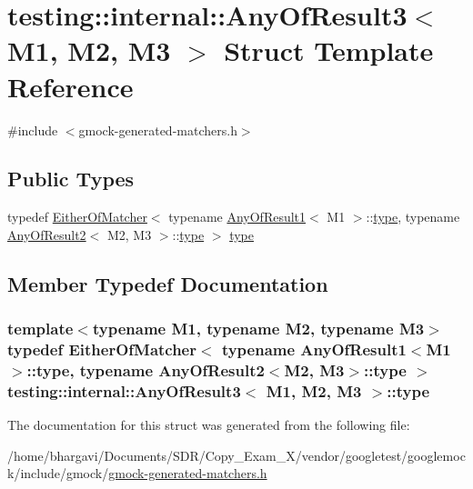 \hypertarget{structtesting_1_1internal_1_1_any_of_result3}{}\section{testing\+:\+:internal\+:\+:Any\+Of\+Result3$<$ M1, M2, M3 $>$ Struct Template Reference}
\label{structtesting_1_1internal_1_1_any_of_result3}


{\ttfamily \#include $<$gmock-\/generated-\/matchers.\+h$>$}

\subsection*{Public Types}
\begin{DoxyCompactItemize}
\item 
typedef \hyperlink{classtesting_1_1internal_1_1_either_of_matcher}{Either\+Of\+Matcher}$<$ typename \hyperlink{structtesting_1_1internal_1_1_any_of_result1}{Any\+Of\+Result1}$<$ M1 $>$\+::\hyperlink{structtesting_1_1internal_1_1_any_of_result3_a232b20553cc0a33a6741e85e19ef4b0c}{type}, typename \hyperlink{structtesting_1_1internal_1_1_any_of_result2}{Any\+Of\+Result2}$<$ M2, M3 $>$\+::\hyperlink{structtesting_1_1internal_1_1_any_of_result3_a232b20553cc0a33a6741e85e19ef4b0c}{type} $>$ \hyperlink{structtesting_1_1internal_1_1_any_of_result3_a232b20553cc0a33a6741e85e19ef4b0c}{type}
\end{DoxyCompactItemize}


\subsection{Member Typedef Documentation}
\subsubsection[{\texorpdfstring{type}{type}}]{\setlength{\rightskip}{0pt plus 5cm}template$<$typename M1, typename M2, typename M3$>$ typedef {\bf Either\+Of\+Matcher}$<$ typename {\bf Any\+Of\+Result1}$<$M1$>$\+::{\bf type}, typename {\bf Any\+Of\+Result2}$<$M2, M3$>$\+::{\bf type} $>$ {\bf testing\+::internal\+::\+Any\+Of\+Result3}$<$ M1, M2, M3 $>$\+::{\bf type}}\hypertarget{structtesting_1_1internal_1_1_any_of_result3_a232b20553cc0a33a6741e85e19ef4b0c}{}\label{structtesting_1_1internal_1_1_any_of_result3_a232b20553cc0a33a6741e85e19ef4b0c}


The documentation for this struct was generated from the following file\+:\begin{DoxyCompactItemize}
\item 
/home/bhargavi/\+Documents/\+S\+D\+R/\+Copy\+\_\+\+Exam\+\_\+X/vendor/googletest/googlemock/include/gmock/\hyperlink{gmock-generated-matchers_8h}{gmock-\/generated-\/matchers.\+h}\end{DoxyCompactItemize}
